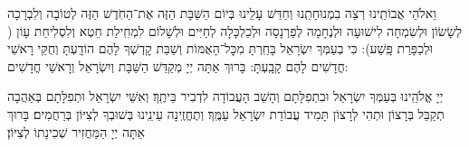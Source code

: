 \begin{sometimes}
 וֵאלֹהֵי אֲבוֹתֵֽינוּ רְצֵה בִמְנוּחָתֵֽנוּ וְחַדֵּשׁ עָלֵֽינוּ בְּיוֹם הַשַּׁבָּת הַזֶּה אֶת־הַחֹֽדֶשׁ הַזֶּה לְטוֹבָה וְלִבְרָכָה לְשָׂשׂוֹן וּלְשִׂמְחָה לִישׁוּעָה וּלְנֶחָמָה לְפַרְנָסָה וּלְכַלְכָּלָה לְחַיִּים וּלְשָׁלוֹם לִמְחִֽילַת חֵטְא וְלִסְלִיחַת עָוֹן 
(
וּלְכַפָּרַת פָּֽשַׁע): כִּי בְעַמְּךָ יִשְׂרָאֵל בָּחַֽרְתָּ מִכׇּל־הָאֻמּוֹת וְשַׁבַּת קׇדְשְׁךָ לָהֶם הוֹדָֽעְתָּ וְחֻקֵּי רָאשֵׁי חֳדָשִׁים לָהֶם קָבָֽעְתָּ: בָּרוּךְ אַתָּה יְיָ מְקַדֵּשׁ הַשַּׁבָּת וְיִשְׂרָאֵל וְרָאשֵׁי חֳדָשִׁים: 

\end{sometimes}

יְיָ אֱלֹהֵֽינוּ בְּעַמְּךָ יִשְׂרָאֵל וּבִתְפִלָּתָם וְהָשֵׁב הָעֲבוֹדָה לִדְבִיר בֵּיתֶֽךָ׃ וְאִשֵּׁי יִשְׂרָאֵל וּתְפִלָּתָם בְּאַהֲבָה תְקַבֵּל בְּרָצוֹן וּתְהִי לְרָצוֹן תָּמִיד עֲבוֹדַת יִשְׂרָאֵל עַמֶּֽךָ׃ וְתֶחֱזֶֽינָה עֵינֵֽינוּ בְּשׁוּבְךָ לְצִיּוֹן בְּרַחֲמִים׃
בָּרוּךְ אַתָּה יְיָ הַמַּחֲזִיר שְׁכִינָתוֹ לְצִיּוֹן׃

\modim

\shabboschanukah

\shabboshodos


\shabbossimshalom

\tachanunim

\fullkaddish

\label{einkelokeinu}

\conclusionshabYT

